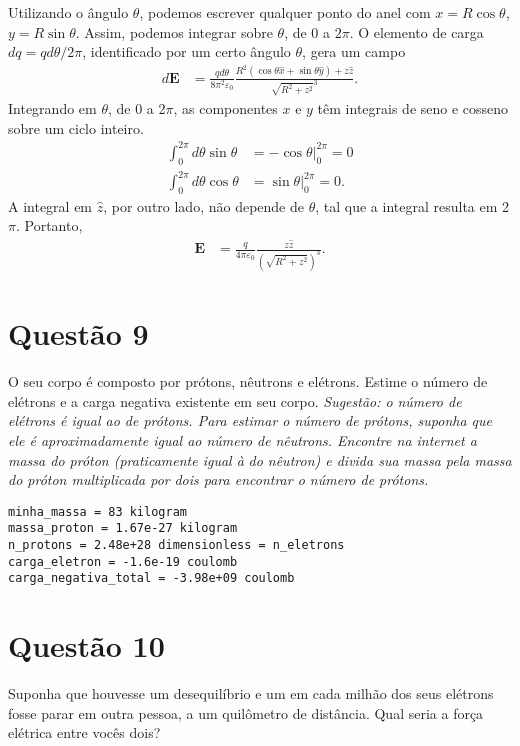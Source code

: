 \documentclass[11pt]{article}
\begin{document}
Utilizando o ângulo \(\theta\), podemos escrever qualquer ponto do anel
com \(x=R\cos\theta\), \(y=R\sin\theta\). Assim, podemos integrar sobre
\(\theta\), de \(0\) a \(2\pi\). O elemento de carga \(dq = qd\theta/2\pi\),
identificado por um certo ângulo \(\theta\), gera um campo
\begin{align*}
  d\mathbf E &= \frac{qd\theta}{8\pi^2\varepsilon_0}
               \frac{R^2(\cos\theta\hat x+\sin\theta\hat y)+z\hat{z}}
               {\sqrt{R^2+z^2}^3}.
\end{align*}
Integrando em \(\theta\), de 0 a 2\(\pi\), as componentes \(x\) e \(y\) têm
integrais de seno e cosseno sobre um ciclo inteiro. 
\begin{align*}
  \int_0^{2\pi} d\theta\sin\theta &= -\cos\theta\Big\vert_0^{2\pi} = 0\\
  \int_0^{2\pi} d\theta\cos\theta &= \sin\theta\Big\vert_0^{2\pi} = 0.
\end{align*}
A integral em \(\hat z\), por outro lado, não depende de \(\theta\), tal que
a integral resulta em 2\(\pi\). Portanto, 
\begin{align*}
  \mathbf E &= \frac{q}{4\pi\varepsilon_0}\frac{z\hat z}{(\sqrt{R^2+z^2})^3}.
\end{align*}
\section{Questão 9}
\label{sec:orgd726092}
O seu corpo é composto por prótons, nêutrons e elétrons. Estime o número
de elétrons e a carga negativa existente em seu corpo. \emph{Sugestão: o}
\emph{número de elétrons é igual ao de prótons. Para estimar o número de}
\emph{prótons, suponha que ele é aproximadamente igual ao número de}
\emph{nêutrons. Encontre na internet a massa do próton (praticamente igual à}
\emph{do nêutron) e divida sua massa pela massa do próton multiplicada por}
\emph{dois para encontrar o número de prótons.}

\begin{verbatim}
minha_massa = 83 kilogram 
massa_proton = 1.67e-27 kilogram 
n_protons = 2.48e+28 dimensionless = n_eletrons
carga_eletron = -1.6e-19 coulomb
carga_negativa_total = -3.98e+09 coulomb
\end{verbatim}

\section{Questão 10}
\label{sec:org807fc17}
Suponha que houvesse um desequilíbrio e um em cada milhão dos seus
elétrons fosse parar em outra pessoa, a um quilômetro de distância. Qual
seria a força elétrica entre vocês dois?
\end{document}
